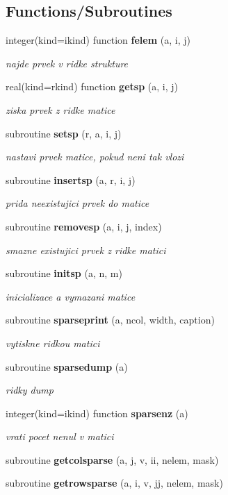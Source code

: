 \subsection*{Functions/\+Subroutines}
\begin{DoxyCompactItemize}
\item 
integer(kind=ikind) function {\bf felem} (a, i, j)
\begin{DoxyCompactList}\small\item\em najde prvek v ridke strukture \end{DoxyCompactList}\item 
real(kind=rkind) function {\bf getsp} (a, i, j)
\begin{DoxyCompactList}\small\item\em ziska prvek z ridke matice \end{DoxyCompactList}\item 
subroutine {\bf setsp} (r, a, i, j)
\begin{DoxyCompactList}\small\item\em nastavi prvek matice, pokud neni tak vlozi \end{DoxyCompactList}\item 
subroutine {\bf insertsp} (a, r, i, j)
\begin{DoxyCompactList}\small\item\em prida neexistujici prvek do matice \end{DoxyCompactList}\item 
subroutine {\bf removesp} (a, i, j, index)
\begin{DoxyCompactList}\small\item\em smazne existujici prvek z ridke matici \end{DoxyCompactList}\item 
subroutine {\bf initsp} (a, n, m)
\begin{DoxyCompactList}\small\item\em inicializace a vymazani matice \end{DoxyCompactList}\item 
subroutine {\bf sparseprint} (a, ncol, width, caption)
\begin{DoxyCompactList}\small\item\em vytiskne ridkou matici \end{DoxyCompactList}\item 
subroutine {\bf sparsedump} (a)
\begin{DoxyCompactList}\small\item\em ridky dump \end{DoxyCompactList}\item 
integer(kind=ikind) function {\bf sparsenz} (a)
\begin{DoxyCompactList}\small\item\em vrati pocet nenul v matici \end{DoxyCompactList}\item 
subroutine {\bf getcolsparse} (a, j, v, ii, nelem, mask)
\item 
subroutine {\bf getrowsparse} (a, i, v, jj, nelem, mask)
\end{DoxyCompactItemize}


